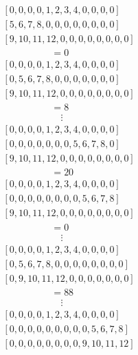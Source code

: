 \documentclass{article}
\begin{document}
\begin{align}
    &[0,0,0,0,1,2,3,4,0,0,0,0]\nonumber\\
    &[5,6,7,8,0,0,0,0,0,0,0,0]\nonumber\\
    &[9,10,11,12,0,0,0,0,0,0,0,0]\nonumber\\
    &\hspace{5em}=0\nonumber\\[0.5cm]
    &[0,0,0,0,1,2,3,4,0,0,0,0]\nonumber\\
    &[0,5,6,7,8,0,0,0,0,0,0,0]\nonumber\\
    &[9,10,11,12,0,0,0,0,0,0,0,0]\nonumber\\
    &\hspace{5em}=8\nonumber\\
    &\hspace{6em}\vdots\nonumber\\
    &[0,0,0,0,1,2,3,4,0,0,0,0]\nonumber\\
    &[0,0,0,0,0,0,0,5,6,7,8,0]\nonumber\\
    &[9,10,11,12,0,0,0,0,0,0,0,0]\nonumber\\
    &\hspace{5em}=20\nonumber\\[0.5cm]
    &[0,0,0,0,1,2,3,4,0,0,0,0]\nonumber\\
    &[0,0,0,0,0,0,0,0,5,6,7,8]\nonumber\\
    &[9,10,11,12,0,0,0,0,0,0,0,0]\nonumber\\
    &\hspace{5em}=0\nonumber\\
    &\hspace{6em}\vdots\nonumber\\
    &[0,0,0,0,1,2,3,4,0,0,0,0]\nonumber\\
    &[0,5,6,7,8,0,0,0,0,0,0,0,0]\nonumber\\
    &[0,9,10,11,12,0,0,0,0,0,0,0]\nonumber\\
    &\hspace{5em}=88\nonumber\\
    &\hspace{6em}\vdots\nonumber\\
    &[0,0,0,0,1,2,3,4,0,0,0,0]\nonumber\\
    &[0,0,0,0,0,0,0,0,0,5,6,7,8]\nonumber\\
    &[0,0,0,0,0,0,0,0,9,10,11,12]
\end{align}


\end{document}
